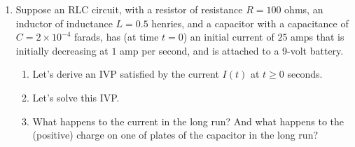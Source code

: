 \documentclass{ximera}
\begin{document}
\begin{enumerate}
\begin{enumerate}
\vfill

\item Now let's assume that in addition to the mechanical damper, we are forcing the mass with a constant $20$ Newtons of upward force.  Using the same conditions (the mass is pulled down by 5 centimeters and released) let's determine the displacement $y(t)$ of the mass above equilibrium (in centimeters) at $t\geq 0$ seconds after being released.

\vfill


\end{enumerate}


\newpage


\item Suppose an RLC circuit, with a resistor of resistance $R=100$ ohms, an inductor of inductance $L=0.5$ henries, and a capacitor with a capacitance of $C=2\times 10^{-4}$ farads, has (at time $t=0$) an initial current of $25$ amps that is initially decreasing at $1$ amp per second, and is attached to a 9-volt battery.

\begin{enumerate}

\item Let's derive an IVP satisfied by the current $I(t)$ at $t\geq 0$ seconds.

\vfill






\item Let's solve this IVP.

\vfill
\vfill








\newpage

\item What happens to the current in the long run?  And what happens to the (positive) charge on one of plates of the capacitor in the long run?





\end{enumerate}


    
\end{enumerate}
\end{document}
